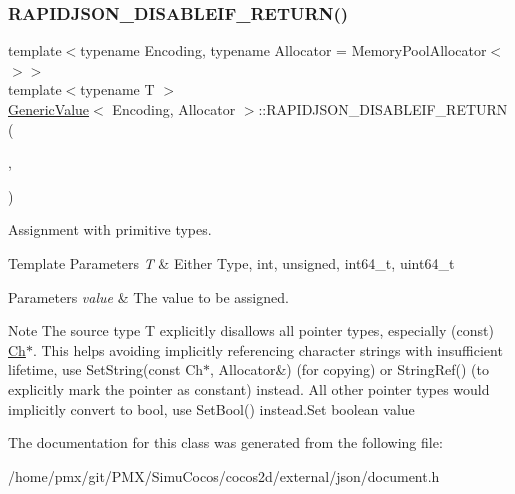 \subsubsection{\texorpdfstring{R\+A\+P\+I\+D\+J\+S\+O\+N\+\_\+\+D\+I\+S\+A\+B\+L\+E\+I\+F\+\_\+\+R\+E\+T\+U\+R\+N()}{RAPIDJSON\_DISABLEIF\_RETURN()}\hspace{0.1cm}{\footnotesize\ttfamily [2/2]}}
{\footnotesize\ttfamily template$<$typename Encoding, typename Allocator = Memory\+Pool\+Allocator$<$$>$$>$ \\
template$<$typename T $>$ \\
\hyperlink{classGenericValue}{Generic\+Value}$<$ Encoding, Allocator $>$\+::R\+A\+P\+I\+D\+J\+S\+O\+N\+\_\+\+D\+I\+S\+A\+B\+L\+E\+I\+F\+\_\+\+R\+E\+T\+U\+RN (\begin{DoxyParamCaption}\item[{(internal\+::\+Is\+Pointer$<$ T $>$)}]{,  }\item[{(\hyperlink{classGenericValue}{Generic\+Value}$<$ Encoding, Allocator $>$ \&)}]{ }\end{DoxyParamCaption})}



Assignment with primitive types. 


\begin{DoxyTemplParams}{Template Parameters}
{\em T} & Either Type, {\ttfamily int}, {\ttfamily unsigned}, {\ttfamily int64\+\_\+t}, {\ttfamily uint64\+\_\+t} \\
\hline
\end{DoxyTemplParams}

\begin{DoxyParams}{Parameters}
{\em value} & The value to be assigned.\\
\hline
\end{DoxyParams}
\begin{DoxyNote}{Note}
The source type {\ttfamily T} explicitly disallows all pointer types, especially ({\ttfamily const}) \hyperlink{classGenericValue_ade0e0ce64ccd5d852da57a35e720bafb}{Ch}$\ast$. This helps avoiding implicitly referencing character strings with insufficient lifetime, use Set\+String(const Ch$\ast$, Allocator\&) (for copying) or String\+Ref() (to explicitly mark the pointer as constant) instead. All other pointer types would implicitly convert to {\ttfamily bool}, use Set\+Bool() instead.\+Set boolean value 
\end{DoxyNote}


The documentation for this class was generated from the following file\+:\begin{DoxyCompactItemize}
\item 
/home/pmx/git/\+P\+M\+X/\+Simu\+Cocos/cocos2d/external/json/document.\+h\end{DoxyCompactItemize}
